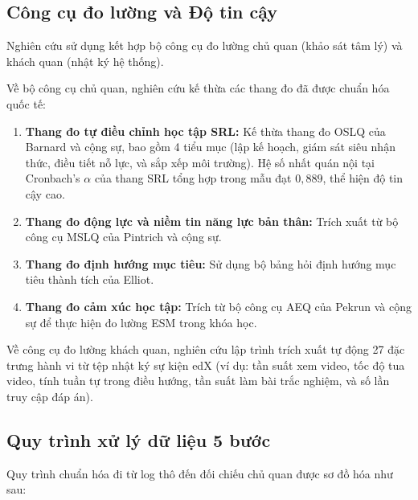 \subsection{Công cụ đo lường và Độ tin cậy}

Nghiên cứu sử dụng kết hợp bộ công cụ đo lường chủ quan (khảo sát tâm lý) và khách quan (nhật ký hệ thống). 

Về bộ công cụ chủ quan, nghiên cứu kế thừa các thang đo đã được chuẩn hóa quốc tế:
\begin{enumerate}
    \item \textbf{Thang đo tự điều chỉnh học tập SRL:} Kế thừa thang đo OSLQ của Barnard và cộng sự, bao gồm 4 tiểu mục (lập kế hoạch, giám sát siêu nhận thức, điều tiết nỗ lực, và sắp xếp môi trường). Hệ số nhất quán nội tại Cronbach's $\alpha$ của thang SRL tổng hợp trong mẫu đạt $0,889$, thể hiện độ tin cậy cao.
    \item \textbf{Thang đo động lực và niềm tin năng lực bản thân:} Trích xuất từ bộ công cụ MSLQ của Pintrich và cộng sự.
    \item \textbf{Thang đo định hướng mục tiêu:} Sử dụng bộ bảng hỏi định hướng mục tiêu thành tích của Elliot.
    \item \textbf{Thang đo cảm xúc học tập:} Trích từ bộ công cụ AEQ của Pekrun và cộng sự để thực hiện đo lường ESM trong khóa học.
\end{enumerate}

Về công cụ đo lường khách quan, nghiên cứu lập trình trích xuất tự động 27 đặc trưng hành vi từ tệp nhật ký sự kiện edX (ví dụ: tần suất xem video, tốc độ tua video, tính tuần tự trong điều hướng, tần suất làm bài trắc nghiệm, và số lần truy cập đáp án).

\subsection{Quy trình xử lý dữ liệu 5 bước}

Quy trình chuẩn hóa đi từ log thô đến đối chiếu chủ quan được sơ đồ hóa như sau:

